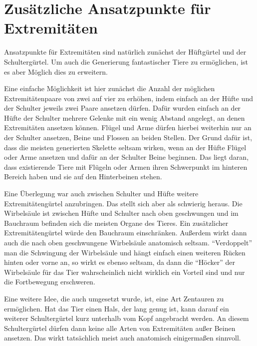 \section{Zusätzliche Ansatzpunkte für Extremitäten}

Ansatzpunkte für Extremitäten sind natürlich zunächst der Hüftgürtel und der Schultergürtel. Um auch die Generierung fantastischer Tiere zu ermöglichen, ist es aber Möglich dies zu erweitern.\\

Eine einfache Möglichkeit ist hier zunächst die Anzahl der möglichen Extremitätenpaare von zwei auf vier zu erhöhen, indem einfach an der Hüfte und der Schulter jeweils zwei Paare ansetzen dürfen. Dafür wurden einfach an der Hüfte \bzw der Schulter mehrere Gelenke mit ein wenig Abstand angelegt, an denen Extremitäten ansetzen können.
Flügel und Arme dürfen hierbei weiterhin nur an der Schulter ansetzen, Beine und Flossen an beiden Stellen. Der Grund dafür ist, dass die meisten generierten Skelette seltsam wirken, wenn an der Hüfte Flügel oder Arme ansetzen und dafür an der Schulter Beine beginnen. Das liegt daran, dass existierende Tiere mit Flügeln oder Armen ihren Schwerpunkt im hinteren Bereich haben und sie auf den Hinterbeinen stehen.

Eine Überlegung war auch zwischen Schulter und Hüfte weitere Extremitätengürtel anzubringen. Das stellt sich aber als schwierig heraus. Die Wirbelsäule ist zwischen Hüfte und Schulter nach oben geschwungen und im Bauchraum befinden sich die meisten Organe des Tieres. Ein zusätzlicher Extremitätengürtel würde den Bauchraum einschränken. Außerdem wirkt dann auch die nach oben geschwungene Wirbelsäule anatomisch seltsam.
"`Verdoppelt"' man die Schwingung der Wirbelsäule und hängt einfach einen weiteren Rücken hinten oder vorne an, so wirkt es ebenso seltsam, da dann die "`Höcker"' der Wirbelsäule für das Tier wahrscheinlich nicht wirklich ein Vorteil sind und nur die Fortbewegung erschweren.

Eine weitere Idee, die auch umgesetzt wurde, ist, eine Art Zentauren zu ermöglichen. Hat das Tier einen Hals, der lang genug ist, kann darauf ein weiterer Schultergürtel kurz unterhalb vom Kopf angebracht werden. An diesem Schultergürtel dürfen dann keine alle Arten von Extremitäten außer Beinen ansetzen. Das wirkt tatsächlich meist auch anatomisch einigermaßen sinnvoll.

